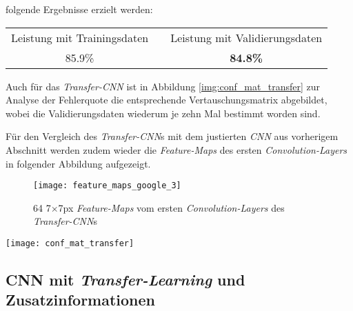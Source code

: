 folgende Ergebnisse erzielt werden:

\begin{table}[h]
	\begin{center}
		\def\arraystretch{1.4}
		\begin{tabular}{ c c c }
			Leistung mit Trainingsdaten &\qquad\qquad\qquad& Leistung mit Validierungsdaten \\
			85.9\% && \textbf{84.8\%}\footnotemark
		\end{tabular}
	\end{center}
\end{table}


Auch für das \textit{Transfer-CNN} ist in Abbildung \ref{img:conf_mat_transfer} zur Analyse der Fehlerquote die entsprechende Vertauschungsmatrix abgebildet, wobei die Validierungsdaten wiederum je zehn Mal bestimmt worden sind.

Für den Vergleich des \textit{Transfer-CNN}s mit dem justierten \textit{CNN} aus vorherigem Abschnitt werden zudem wieder die \textit{Feature-Maps} des ersten \textit{Convolution-Layers} in folgender Abbildung aufgezeigt.

\begin{figure}[h]
	\centering
	\texttt{[image: feature\_maps\_google\_3]}
	\caption[\textit{Feature-Maps} vom \textit{Transfer-CNN}]{64 7$\times$7px \textit{Feature-Maps} vom ersten \textit{Convolution-Layers} des \textit{Transfer-CNN}s}
	\label{img:feature_maps_transfer}
\end{figure}

\begin{sidewaysfigure}
	\centering
	\texttt{[image: conf\_mat\_transfer]}
	\caption[Vertauschungsmatrix des transferierten \textit{CNN}s]{Vertauschungsmatrix des \textit{Transfer-CNN}s, Validierungsdaten je zehn mal bestimmt: Auf der Diagonalen befinden sich die Anzahl korrekt klassifizierten Validierungsdaten, die restlichen sind falsch bestimmt worden.}
	\label{img:conf_mat_transfer}
\end{sidewaysfigure}

\newpage

\subsection{CNN mit \textit{Transfer-Learning} und Zusatzinformationen}

